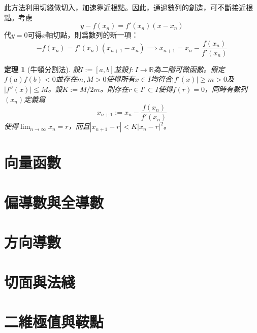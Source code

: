 \documentclass[12pt]{article}
\newtheorem*{theorem}{定理}
\begin{document}
    此方法利用切綫做切入，加速靠近根點。因此，通過數列的創造，可不斷接近根點。考慮$$y-f(x_n)=f'(x_n)(x-x_n)$$代$y=0$可得$x$軸切點，則爲數列的新一項：$$-f(x_n)=f'(x_n)(x_{n+1}-x_n) \implies x_{n+1}=x_n-\frac{f(x_n)}{f'(x_n)}$$

    \begin{theorem}[牛頓分割法]
        設$I:=[a,b]$並設$f:I\to\mathbb{R}$為二階可微函數。假定$f(a)f(b)<0$並存在$m,M>0$使得所有$x\in I$均符合$|f'(x)|\geq m>0$及$|f''(x)|\leq M$。設$K:=M/2m$。則存在$r\in I'\subset I$使得$f(r)=0$，同時有數列$(x_n)$定義爲$$x_{n+1}:=x_n-\frac{f(x_n)}{f'(x_n)}$$使得$\displaystyle\lim_{n\to \infty}x_n=r$，而且$|x_{n+1}-r|<K|x_n-r|^2$。
    \end{theorem}
    
    \section*{向量函數}

    \section*{偏導數與全導數}

    \section*{方向導數}

    \section*{切面與法綫}

    \section*{二維極值與鞍點}
\end{document}
